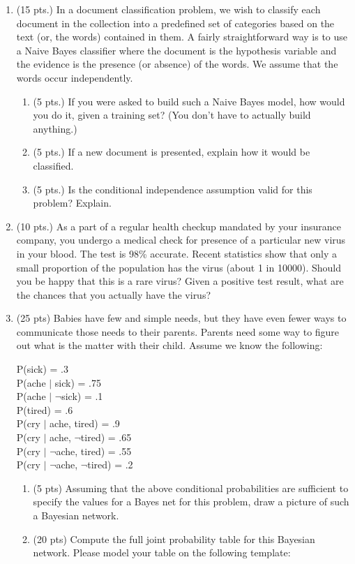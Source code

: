 \documentclass{article}%
\begin{document}
\begin{enumerate}
\item (15 pts.) In a document classification problem, we wish to classify each document in the collection into a predefined set of categories based on the text (or, the words) contained in them. A fairly straightforward way is to use a Naive Bayes classifier where the document is the hypothesis variable and the evidence is the presence (or absence) of the words. We assume that the words occur independently.
	\begin{enumerate}
  		\item (5 pts.) If you were asked to build such a Naive Bayes model, how would you do it, given a training set? (You don't have to actually build anything.)
  		\item (5 pts.) If a new document is presented, explain how it would be classified.
		\item (5 pts.) Is the conditional independence assumption valid for this problem? Explain. 
	\end{enumerate}

\item (10 pts.) As a part of a regular health checkup mandated by your insurance company, you undergo a medical check for presence of a particular new virus in your blood. The test is 98\% accurate. Recent statistics show that only a small proportion of the population has the virus (about 1 in 10000). Should you be happy that this is a rare virus? Given a positive test result, what are the chances that you actually have the virus? 

\item (25 pts) Babies have few and simple needs, but they have even fewer ways to communicate those needs to their parents. Parents need some way to figure out what is the matter with their child. Assume we know the following:

P(sick) = .3 \\
P(ache $|$ sick) = .75\\
P(ache $|$ $\neg$sick) = .1\\
P(tired) = .6\\
P(cry $|$ ache, tired) = .9\\
P(cry $|$ ache, $\neg$tired) = .65\\
P(cry $|$ $\neg$ache, tired) = .55\\
P(cry $|$ $\neg$ache, $\neg$tired) = .2\\

	\begin{enumerate}
		\item (5 pts) Assuming that the above conditional probabilities are sufficient to specify the values for a Bayes net for this problem, draw a picture of such a Bayesian network.
		\item (20 pts) Compute the full joint probability table for this Bayesian network. Please model your table on the following template:
	\end{enumerate}
	

\end{enumerate}
\end{document}
